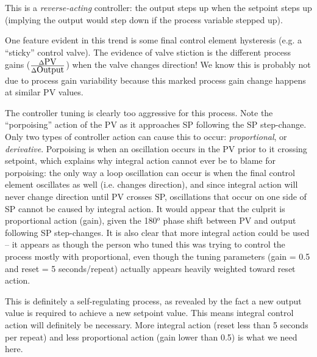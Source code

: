 \vskip 10pt

This is a {\it reverse-acting} controller: the output steps up when the setpoint steps up (implying the output would step down if the process variable stepped up).

\vskip 10pt

One feature evident in this trend is some final control element hysteresis (e.g. a ``sticky'' control valve).  The evidence of valve stiction is the different process gains ($\Delta \hbox{PV} \over \Delta \hbox{Output}$) when the valve changes direction!  We know this is probably not due to process gain variability because this marked process gain change happens at similar PV values.

\vskip 10pt
  
The controller tuning is clearly too aggressive for this process.  Note the ``porpoising'' action of the PV as it approaches SP following the SP step-change.  Only two types of controller action can cause this to occur: {\it proportional}, or {\it derivative}.  Porpoising is when an oscillation occurs in the PV prior to it crossing setpoint, which explains why integral action cannot ever be to blame for porpoising: the only way a loop oscillation can occur is when the final control element oscillates as well (i.e. changes direction), and since integral action will never change direction until PV crosses SP, oscillations that occur on one side of SP cannot be caused by integral action.  It would appear that the culprit is proportional action (gain), given the 180$^{o}$ phase shift between PV and output following SP step-changes.  It is also clear that more integral action could be used -- it appears as though the person who tuned this was trying to control the process mostly with proportional, even though the tuning parameters (gain = 0.5 and reset = 5 seconds/repeat) actually appears heavily weighted toward reset action.

\vskip 10pt

This is definitely a self-regulating process, as revealed by the fact a new output value is required to achieve a new setpoint value.  This means integral control action will definitely be necessary.  More integral action (reset less than 5 seconds per repeat) and less proportional action (gain lower than 0.5) is what we need here.











